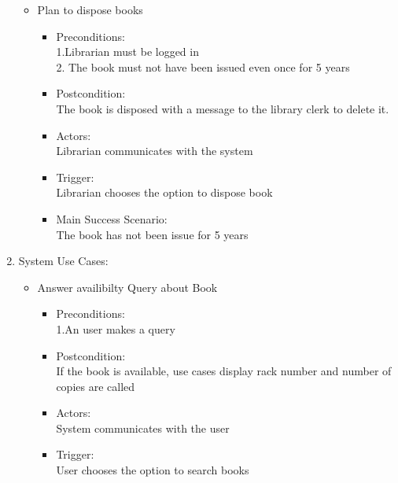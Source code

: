 \documentclass{article}
\begin{document}
\begin{enumerate}
\begin{itemize}
\item Plan to dispose books\\ 
 \begin{itemize}
  \item Preconditions:\\ 1.Librarian must be logged in\\ 2. The book must not have been issued even once for 5 years\\ 
 \item Postcondition:\\ The book is disposed with a message to the library clerk to delete it.\\ 
 \item Actors:\\  Librarian communicates with the system\\ 
 \item Trigger:\\  Librarian  chooses the option to dispose book\\ 
 \item Main Success Scenario:\\  The book has not been issue for 5 years\\ 
 \end{itemize}
 

\end{itemize}

\item System Use Cases:\\ 
 \begin{itemize}
 
  \item Answer availibilty Query about Book\\ 
	\begin{itemize}
	\item  Preconditions:\\ 1.An user makes a query\\ 
 \item Postcondition: \\ If the book is available, use cases display rack number and number of copies are called\\ 
 \item Actors:\\  System communicates with the user\\ 
 \item Trigger: \\ User chooses the option to search books\\ 
	\end{itemize}


\end{itemize}
\end{enumerate}
\end{document}
